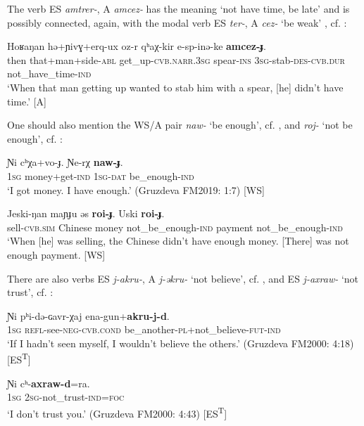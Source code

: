 \documentclass[output=paper,colorlinks,citecolor=brown]{langscibook}
\begin{document}
The verb ES \textit{amtrer-}, A \textit{amcez-} has the meaning ‘not have time, be late’ and is possibly connected, again, with the modal verb ES \textit{ter-}, A \textit{cez-} ‘be weak’ \citep[163]{Panfilov1965}, cf. :

\ea\label{ex:niv:108}
    \gll Hoʁaŋan hə+ɲivɣ+erq-ux oz-r qʰaχ-kir e-sp-inə-ke \textbf{amcez-ɟ}.\\ 
         then that+man+side-\textsc{abl} get\_up-\textsc{cvb.narr.3sg} spear-\textsc{ins} \textsc{3sg}{}-stab-\textsc{des-cvb.dur} not\_have\_time-\textsc{ind} \\
    \glt ‘When that man getting up wanted to stab him with a spear, [he] didn’t have time.’ \citep[163]{Panfilov1965} [A]
\z 

One should also mention the WS/A pair \textit{naw-} ‘be enough’, cf. , and \textit{roj-} ‘not be enough’, cf. :

\ea\label{ex:niv:109}
    \gll Ɲi cʰχa+vo-ɟ. Ɲe-rχ \textbf{naw-ɟ}. \\ 
         \textsc{1sg} money+get-\textsc{ind} 1\textsc{sg}{}-\textsc{dat} be\_enough-\textsc{ind} \\
    \glt ‘I got money. I have enough.’ (Gruzdeva FM2019: 1:7) [WS]
\z 

\ea\label{ex:niv:110}
    \gll Jeski-ŋan maɲɟu əs \textbf{roi-ɟ}. Uski \textbf{roi-ɟ}.\\ 
         sell-\textsc{cvb.sim} Chinese money not\_be\_enough-\textsc{ind} payment not\_be\_enough-\textsc{ind}\\
    \glt ‘When [he] was selling, the Chinese didn’t have enough money. [There] was not enough payment. \citep[250]{Panfilov1965} [WS]
\z 

There are also verbs ES \textit{j-akru-}, A \textit{j-ǝkru-} ‘not believe’, cf. , and ES \textit{j-axraw-} ‘not trust’, cf. :

\ea\label{ex:niv:111}
    \gll Ɲi pʰi-dǝ-ɢavr-χaj ena-gun+\textbf{akru-j-d}. \\ 
         \textsc{1sg} \textsc{refl}{}-see-\textsc{neg-cvb.cond} be\_another\textsc{{}-pl}+not\_believe-\textsc{fut-ind} \\
    \glt ‘If I hadn’t seen myself, I wouldn’t believe the others.’ (Gruzdeva FM2000: 4:18) [ES\textsuperscript{T}]
\z 

\ea\label{ex:niv:112}
    \gll Ɲi cʰ-\textbf{axraw-d}=ra. \\ 
         \textsc{1sg} \textsc{2sg}{}-not\_trust-\textsc{ind=foc} \\
    \glt ‘I don’t trust you.’ (Gruzdeva FM2000: 4:43) [ES\textsuperscript{T}]
\z 
\end{document}
